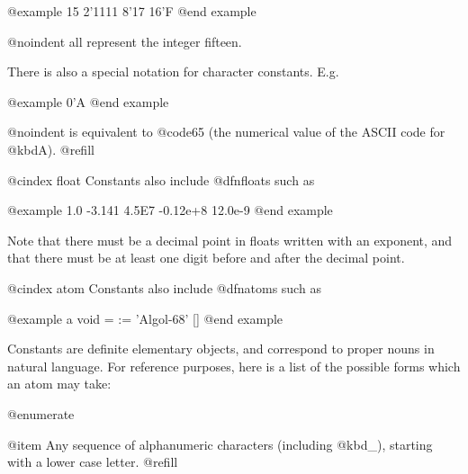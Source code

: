 @example
15   2'1111   8'17    16'F
@end example

@noindent
all represent the integer fifteen.

There is also a special notation for character constants.  E.g.

@example
0'A
@end example

@noindent
is equivalent to @code{65} (the numerical value of the ASCII code for
@kbd{A}). @refill

@cindex float
Constants also include @dfn{floats} such as

@example
1.0   -3.141   4.5E7   -0.12e+8   12.0e-9
@end example

Note that there must be a decimal point in floats written with an exponent,
and that there must be at least one digit before and after the decimal point.

@cindex atom
Constants also include @dfn{atoms} such as

@example
a   void   =   :=   'Algol-68'   []
@end example

Constants are definite elementary objects, and correspond to proper nouns
in natural language.  For reference purposes, here is a list of the
possible forms which an atom may take:

@enumerate

@item
Any  sequence  of  alphanumeric characters (including @kbd{_}), starting
with a lower case letter. @refill

